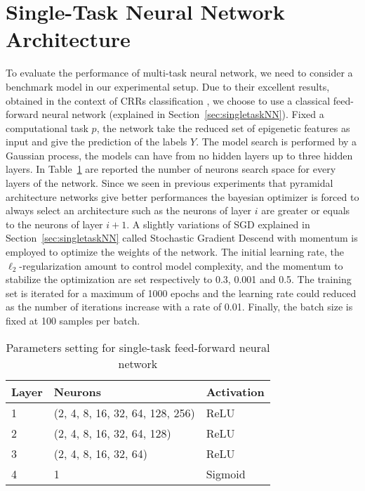 \section{Single-Task Neural Network Architecture}
To evaluate the performance of multi-task neural network, we need to consider a benchmark model in our experimental setup. Due to their excellent results, obtained in the context of CRRs classification \cite{WassermannDECRES}, we choose to use a classical feed-forward neural network (explained in Section~\ref{sec:singletaskNN}). Fixed a computational task $p$, the network take the reduced set of epigenetic features as input and give the prediction of the labels $Y$. The model search is performed by a Gaussian process, the models can have from no hidden layers up to three hidden layers. In Table~\ref{tab:mlp_single_arch} are reported the number of neurons search space for every layers of the network. Since we seen in previous experiments that pyramidal architecture networks give better performances the bayesian optimizer is forced to always select an architecture such as the neurons of layer $i$ are greater or equals to the neurons of layer $i+1$. 
A slightly variations of SGD explained in Section~\ref{sec:singletaskNN} called Stochastic Gradient Descend with momentum is employed to optimize the weights of the network. The initial learning rate, the $\ell_2$-regularization amount to control model complexity, and the momentum to stabilize the optimization are set respectively to 0.3, 0.001 and 0.5. The training set is iterated for a maximum of 1000 epochs and the learning rate could reduced as the number of iterations increase with a rate of 0.01. Finally, the batch size is fixed at 100 samples per batch.  
\begin{table}[t]
\centering
\begin{tabular}{lll}
\toprule
\textbf{Layer} & \textbf{Neurons} & \textbf{Activation} \\ 
\midrule
1 & (2, 4, 8, 16, 32, 64, 128, 256) & ReLU \\ 
\midrule
2 & (2, 4, 8, 16, 32, 64, 128) & ReLU \\ 
\midrule
3 & (2, 4, 8, 16, 32, 64) & ReLU \\ 
\midrule
4 & 1 & Sigmoid \\ 
\bottomrule
\end{tabular}
\caption{Parameters setting for single-task feed-forward neural network}
\label{tab:mlp_single_arch}
\end{table}

